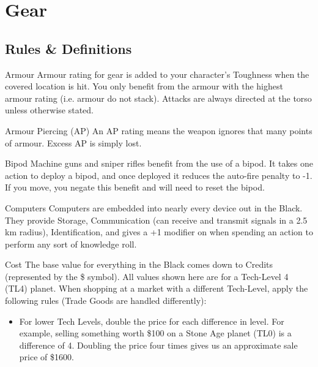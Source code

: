 
\section{Gear}
\label{sec:gear}

\begin{multicols}{2}

\subsection{Rules \& Definitions}
\label{sec:gear-rules}

\begin{genericsection}{Armour}
Armour rating for gear is added to your character's Toughness when the covered location is hit. You only benefit from the armour with the highest armour rating (i.e. armour do not stack). Attacks are always directed at the torso unless otherwise stated.
\end{genericsection}

\begin{genericsection}{Armour Piercing (AP)}
An AP rating means the weapon ignores that many points of armour. Excess AP is simply lost.
\end{genericsection}

\begin{genericsection}{Bipod}
Machine guns and sniper rifles benefit from the use of a bipod. It takes one action to deploy a bipod, and once deployed it reduces the auto-fire penalty to -1. If you move, you negate this benefit and will need to reset the bipod.
\end{genericsection}

\begin{genericsection}{Computers}
Computers are embedded into nearly every device out in the Black. They provide Storage, Communication (can receive and transmit signals in a 2.5 km radius), Identification, and gives a +1 modifier on when spending an action to perform any sort of knowledge roll.
\end{genericsection}

\begin{genericsection}{Cost}
The base value for everything in the Black comes down to Credits (represented by the \$ symbol). All values shown here are for a Tech-Level 4 (TL4) planet. When shopping at a market with a different Tech-Level, apply the following rules (Trade Goods are handled differently):
\begin{itemize}
  \item For lower Tech Levels, double the price for each difference in level. For example, selling something worth \$100 on a Stone Age planet (TL0) is a difference of 4. Doubling the price four times gives us an approximate sale price of \$1600.


\end{itemize}
\end{genericsection}
\end{multicols}
